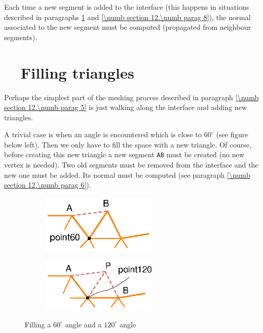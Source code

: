 Each time a new segment is added to the interface (this happens in situations described in
paragraphs \ref{\numb section 12.\numb parag 7} and \ref{\numb section 12.\numb parag 8}),
the normal associated to the new segment must be computed (propagated from neighbour
segments).


\section{~~Filling triangles}\label{\numb section 12.\numb parag 7}

Perhaps the simplest part of the meshing process described in paragraph
\ref{\numb section 12.\numb parag 5} is just walking along the interface and
adding new triangles.

A trivial case is when an angle is encountered which is close to $ 60^\circ $
(see figure below left).
Then we only have to fill the space with a new triangle.
Of course, before creating this new triangle a new segment {\small\tt AB} must be created
(no new vertex is needed).
Two old segments must be removed from the interface and the new one must be added.
Its normal must be computed (see paragraph \ref{\numb section 12.\numb parag 6}).

\begin{figure}[ht] \centering
\begin{subfigure}{71mm}\centering
  \includegraphics[width=55mm]{fill-angle-60}
\end{subfigure}  
\begin{subfigure}{71mm}\centering
  \includegraphics[width=55mm]{fill-angle-120}
\end{subfigure}  
  \caption{Filling a $ 60^\circ $ angle and a $ 120^\circ $ angle}
  \label{\numb section 12.\numb fig 3}
\end{figure}

